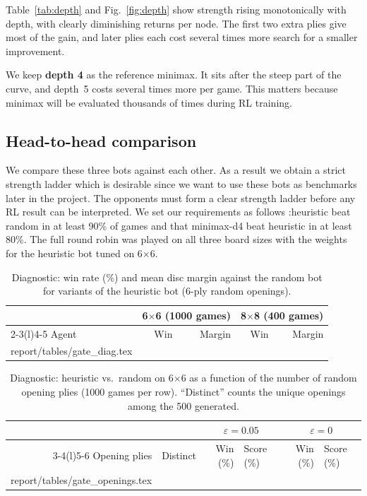 \documentclass[11pt]{article}
\makeatletter
\newcommand{\bx}[1]{#1$\times$#1}
\newcommand{\tabinput}[1]{\@@input #1 }
\makeatother
\begin{document}
Table~\ref{tab:depth} and Fig.~\ref{fig:depth} show strength rising
monotonically with depth, with clearly diminishing returns per node. The first
two extra plies give most of the gain, and later plies each cost several times
more search for a smaller improvement. 

We keep \textbf{depth 4} as the reference minimax. It sits after the steep part
of the curve, and depth~5 costs several times more per game. This matters
because minimax will be evaluated thousands of times during RL training.
\newpage
\subsection{Head-to-head comparison}
\label{sec:bots_compare}
We compare these three bots against each other. As a result we obtain a strict strength
ladder which is desirable since we want to use these bots as benchmarks later in the project.
The opponents must form a clear strength ladder before any RL result can be
interpreted. We set our requirements as follows :heuristic beat random in at least 90\%
of games and that minimax-d4 beat heuristic in at least 80\%. The full round
robin was played on all three board sizes with the weights for the heuristic bot tuned on \bx{6}.


\begin{table}[H]
\centering
\caption{Diagnostic: win rate (\%) and mean disc margin against the random bot
for variants of the heuristic bot (6-ply random openings).}
\label{tab:diag}
\begin{tabular}{@{}lrrrr@{}}
\toprule
& \multicolumn{2}{c}{\bx{6} (1000 games)} & \multicolumn{2}{c}{\bx{8} (400 games)} \\
\cmidrule(lr){2-3}\cmidrule(l){4-5}
Agent & Win & Margin & Win & Margin \\
\midrule
\tabinput{report/tables/gate_diag.tex}
\bottomrule
\end{tabular}
\end{table}

\begin{table}[H]
\centering
\caption{Diagnostic: heuristic vs.\ random on \bx{6} as a function of the number
of random opening plies (1000 games per row). ``Distinct'' counts the unique
openings among the 500 generated.}
\label{tab:openings}
\begin{tabular}{@{}rrrlrl@{}}
\toprule
& & \multicolumn{2}{c}{$\varepsilon=0.05$} & \multicolumn{2}{c}{$\varepsilon=0$} \\
\cmidrule(lr){3-4}\cmidrule(l){5-6}
Opening plies & Distinct & Win (\%) & Score (\%) & Win (\%) & Score (\%) \\
\midrule
\tabinput{report/tables/gate_openings.tex}
\bottomrule
\end{tabular}
\end{table}
\end{document}
